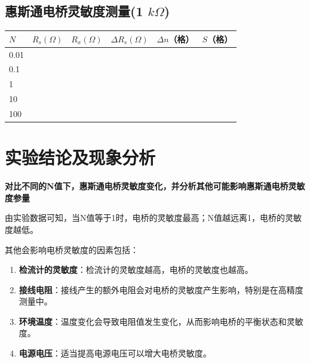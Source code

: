 \documentclass{ctexart}
\begin{document}
\subsection{惠斯通电桥灵敏度测量(1 $ k\varOmega $)}

\begin{table}[!h]
    \centering
    \renewcommand{\arraystretch}{1.5} %
    \begin{tabular}{|m{1.3cm}<{\centering}|m{1.3cm}<{\centering}|m{1.3cm}<{\centering}|m{1.3cm}<{\centering}|m{1.3cm}<{\centering}|m{1.3cm}<{\centering}|}
        \hline
        $N$ & $R_s (\varOmega)$ & $R_x (\varOmega)$ & $\Delta R_s (\varOmega)$ & $\Delta n$（格） & $S$（格） \\
        \hline
        0.01 & & & & & \\
        \hline
        0.1 & & & & & \\
        \hline
        1 & & & & & \\
        \hline
        10 & & & & & \\
        \hline
        100 & & & & & \\
        \hline
    \end{tabular}
\end{table}


\newpage

\section{实验结论及现象分析}


\textbf{对比不同的N值下，惠斯通电桥灵敏度变化，并分析其他可能影响惠斯通电桥灵敏度参量}

由实验数据可知，当N值等于1时，电桥的灵敏度最高；N值越远离1，电桥的灵敏度越低。

其他会影响电桥灵敏度的因素包括：
\begin{enumerate}
    \item \textbf{检流计的灵敏度}：检流计的灵敏度越高，电桥的灵敏度也越高。
    \item \textbf{接线电阻}：接线产生的额外电阻会对电桥的灵敏度产生影响，特别是在高精度测量中。
    \item \textbf{环境温度}：温度变化会导致电阻值发生变化，从而影响电桥的平衡状态和灵敏度。
    \item \textbf{电源电压}：适当提高电源电压可以增大电桥灵敏度。
\end{enumerate}
\end{document}
